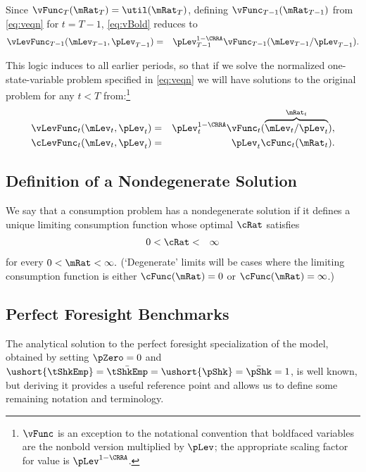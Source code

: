 \documentclass[titlepage]{\econtex}\providecommand{\texname}{BufferStockTheory}%
\begin{document}
Since $\vFunc_{T}(\mRat_{T}) = \util(\mRat_{T})$, defining $\vFunc_{T-1}(\mRat_{T-1})$ from \eqref{eq:veqn} for $t=T-1$, \eqref{eq:vBold} reduces to
\begin{eqnarray*}
\vLevFunc_{T-1}(\mLev_{T-1},\pLev_{T-1}) & = & \pLev_{T-1}^{1-\CRRA} \vFunc_{T-1}(\mLev_{T-1}/\pLev_{T-1}).
\end{eqnarray*}

This logic induces to all earlier periods, so that if we solve the
normalized one-state-variable problem specified in \eqref{eq:veqn} we
will have solutions to the original problem for any $t<T$
from:\footnote{$\vFunc$ is an exception to the notational convention
  that boldfaced variables are the nonbold version multiplied by
  $\pLev$; the appropriate scaling factor for value is
  $\pLev^{1-\CRRA}$.}
\begin{eqnarray*}
   \vLevFunc_{t}(\mLev_{t},\pLev_{t}) & = & \pLev_{t}^{1-\CRRA}\vFunc_{t}(\overbrace{\mLev_{t}/\pLev_{t}}^{\mRat_{t}}),
\\ \cLevFunc_{t}(\mLev_{t},\pLev_{t}) & = & \pLev_{t}\cFunc_{t}(\mRat_{t}).
\end{eqnarray*}

\subsection{Definition of a Nondegenerate Solution}

We say that a consumption problem has a nondegenerate solution if it
defines a unique limiting consumption function whose optimal
$\cRat$ satisfies
\begin{eqnarray}
  0 & < \cRat < & \infty
\end{eqnarray}
for every $0 < \mRat < \infty.$ (`Degenerate' limits will be cases
where the limiting consumption function is either $\cFunc(\mRat)=0$ or $\cFunc(\mRat)=\infty$.)


\subsection{Perfect Foresight Benchmarks}

The analytical solution to the perfect foresight specialization of the model, obtained by setting $\pZero=0$ and $\ushort{\tShkEmp}=\bar{\tShkEmp}=\ushort{\pShk}=\bar{\pShk}=1$, is well known, but deriving it provides a useful reference point and allows us to define some remaining notation and terminology.
\end{document}
